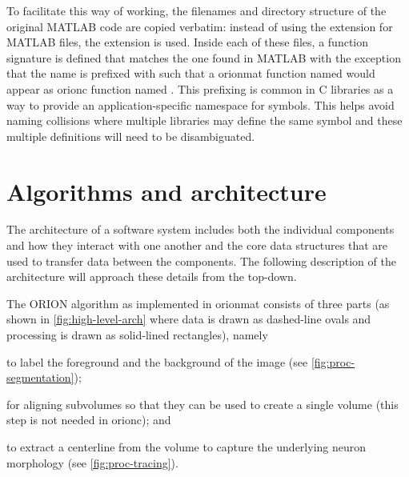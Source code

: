 To facilitate this way of working, the filenames and directory
structure of the original MATLAB code are copied verbatim: instead
of using the  extension for MATLAB files, the
 extension is used. Inside each of these
 files, a function signature is defined that
matches the one found in MATLAB with the exception that the name
is prefixed with  such that a \gls{orionmat}
function named  would appear as
\gls{orionc} function named .
This prefixing is common in C libraries as a way to provide
an application-specific namespace for symbols. This helps avoid
naming collisions where multiple libraries may define the same
symbol and these multiple definitions will need to be disambiguated.

\section{Algorithms and architecture}

The architecture of a software system includes both the individual
components and how they interact with one another and the core
data structures that are used to transfer data between the
components. The following description of the architecture will
approach these details from the top-down.

The ORION algorithm as implemented in \gls{orionmat} consists of three parts (as shown in
\cref{fig:high-level-arch} where data is drawn as dashed-line
ovals and processing is drawn as solid-lined rectangles),
namely
\begin{description}[font=\textpluscolon]
	\item[Segmentation] to label the
		foreground and the background of the image (see
		\cref{fig:proc-segmentation});
	\item[Registration] for aligning subvolumes so
		that they can be used to create a single volume
		(this step is not needed in \gls{orionc});
		and
	\item[Tracing] to extract a centerline from the volume to
		capture the underlying neuron morphology (see
		\cref{fig:proc-tracing}).
\end{description}



